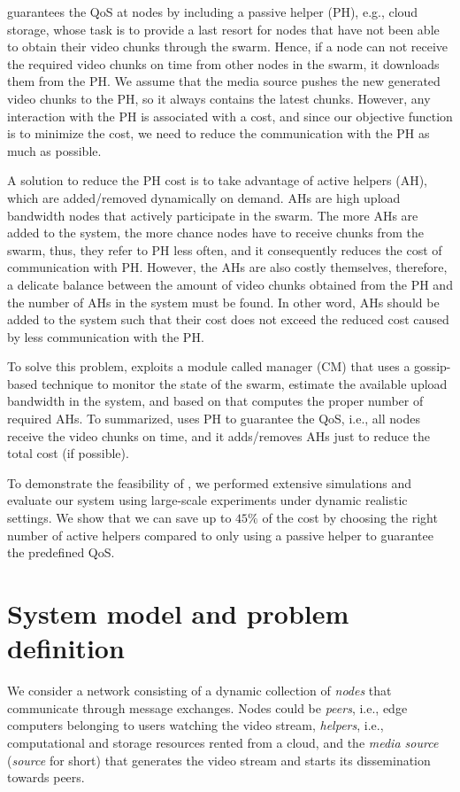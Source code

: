 \clive guarantees the QoS at nodes by including a passive helper (PH), e.g., cloud storage, whose task is to provide a last resort for nodes that have not been able to obtain their video chunks through the swarm. Hence, if a node can not receive the required video chunks on time from other nodes in the swarm, it downloads them from the PH. We assume that the media source pushes the new generated video chunks to the PH, so it always contains the latest chunks. However, any interaction with the PH is associated with a cost, and since our objective function is to minimize the cost, we need to reduce the communication with the PH as much as possible.

A solution to reduce the PH cost is to take advantage of active helpers (AH), which are added/removed dynamically on demand. AHs are high upload bandwidth nodes that actively participate in the swarm. The more AHs are added to the system, the more chance nodes have to receive chunks from the swarm, thus, they refer to PH less often, and it consequently reduces the cost of communication with PH. However, the AHs are also costly themselves, therefore, a delicate balance between the amount of video chunks obtained from the PH and the number of AHs in the system must be found. In other word, AHs should be added to the system such that their cost does not exceed the reduced cost caused by less communication with the PH.

To solve this problem, \clive exploits a module called \clive manager (CM) that uses a gossip-based technique to monitor the state of the swarm, estimate the available upload bandwidth in the system, and based on that computes the proper number of required AHs. To summarized, \clive uses PH to guarantee the QoS, i.e., all nodes receive the video chunks on time, and it adds/removes AHs just to reduce the total cost (if possible).

To demonstrate the feasibility of \clive, we performed extensive simulations
and evaluate our system using large-scale experiments under dynamic realistic
settings. We show that we can save up to $45\%$ of the cost by choosing the
right number of active helpers compared to only using a passive helper to
guarantee the predefined QoS.

\section{System model and problem definition} \label{sec:problem}

We consider a network consisting of a dynamic collection of \emph{nodes} that
communicate through message exchanges. Nodes could be \emph{peers}, i.e., edge
computers belonging to users watching the video stream, \emph{helpers}, i.e.,
computational and storage resources rented from a cloud, and the
\emph{media source} (\emph{source} for short) that generates the video
stream and starts its dissemination towards peers.

